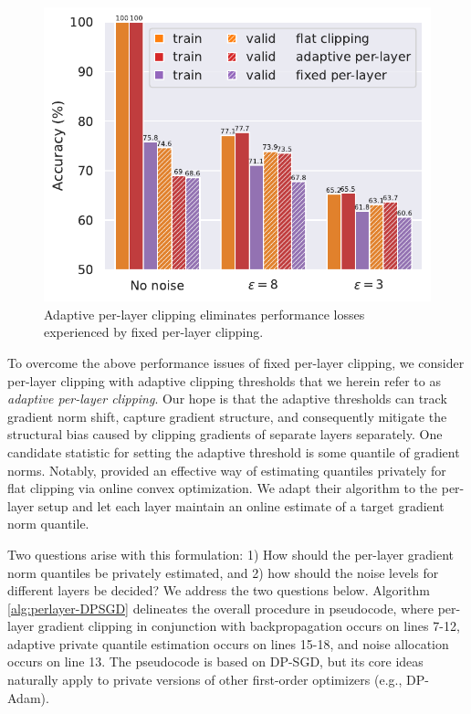 \begin{figure}
    \centering
    \includegraphics[width=.38\textwidth]{files/fig/cifar_withour_noise_single.pdf}
    \caption{Adaptive per-layer clipping eliminates performance losses experienced by fixed per-layer clipping.}
    \label{fig:cifar_without_noise}
\end{figure}
To overcome the above performance issues of fixed per-layer clipping, we consider per-layer clipping with adaptive clipping thresholds that we herein refer to as \emph{adaptive per-layer clipping}. 
Our hope is that the adaptive thresholds can track gradient norm shift, capture gradient structure, and consequently mitigate the structural bias caused by clipping gradients of separate layers separately. 
One candidate statistic for setting the adaptive threshold is some quantile of gradient norms. 
Notably, \cite{andrew2019differentially} provided an effective way of estimating  quantiles privately for flat clipping via online convex optimization.
We adapt their algorithm to the per-layer setup and let each layer maintain an online estimate of a target gradient norm quantile. %


Two questions arise with this formulation: 1) How should the per-layer gradient norm quantiles be privately estimated, and 2) how should the noise levels for different layers be decided? 
We address the two questions below. 
Algorithm \ref{alg:perlayer-DPSGD} delineates the overall procedure in pseudocode, where per-layer gradient clipping in conjunction with backpropagation occurs on lines 7-12, adaptive private quantile estimation occurs on lines 15-18, and noise allocation occurs on line 13. 
The pseudocode is based on DP-SGD, but its core ideas naturally apply to private versions of other first-order optimizers (e.g., DP-Adam).



